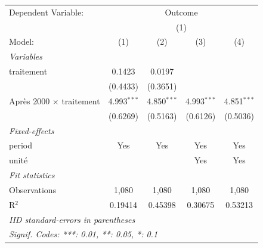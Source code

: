 
\begingroup
\centering
\begin{tabular}{lcccc}
   \tabularnewline \midrule \midrule
   Dependent Variable: & \multicolumn{4}{c}{Outcome}\\
    & \multicolumn{4}{c}{(1)} \\ 
   Model:                          & (1)           & (2)           & (3)           & (4)\\  
   \midrule
   \emph{Variables}\\
   traitement                      & 0.1423        & 0.0197        &               &   \\   
                                   & (0.4433)      & (0.3651)      &               &   \\   
   Après 2000 $\times$ traitement  & 4.993$^{***}$ & 4.850$^{***}$ & 4.993$^{***}$ & 4.851$^{***}$\\   
                                   & (0.6269)      & (0.5163)      & (0.6126)      & (0.5036)\\   
   \midrule
   \emph{Fixed-effects}\\
   period                          & Yes           & Yes           & Yes           & Yes\\  
   unité                           &               &               & Yes           & Yes\\  
   \midrule
   \emph{Fit statistics}\\
   Observations                    & 1,080         & 1,080         & 1,080         & 1,080\\  
   R$^2$                           & 0.19414       & 0.45398       & 0.30675       & 0.53213\\  
   \midrule \midrule
   \multicolumn{5}{l}{\emph{IID standard-errors in parentheses}}\\
   \multicolumn{5}{l}{\emph{Signif. Codes: ***: 0.01, **: 0.05, *: 0.1}}\\
\end{tabular}
\par\endgroup


